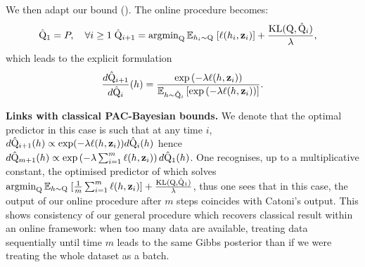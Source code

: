 We then adapt our \OPBTrain bound (). The online procedure becomes:
\begin{align}
  \label{eq: pacb_online_alg_specific_case}
  \hat{\mathrm{Q}}_1= P, \quad \forall i\geq1\; \hat{\mathrm{Q}}_{i+1}&= \operatorname{argmin}_{\mathrm{Q}} \mathbb{E}_{h_i\sim \mathrm{Q}} \; [\ell(h_i,\mathbf{z}_i)] + \frac{\operatorname{KL}(\mathrm{Q},\hat{\mathrm{Q}}_{i})}{\lambda},
\end{align}
which leads to the explicit formulation
\begin{align*}
  \frac{d\hat{\mathrm{Q}}_{i+1}}{d\hat{\mathrm{Q}}_{i}}(h) = \frac{\exp\left(-\lambda  \ell(h,\mathbf{z}_i)\right)}{\mathbb{E}_{h\sim \hat{\mathrm{Q}}_{i}}\left[\exp\left(-\lambda  \ell(h,\mathbf{z}_i)\right)\right]}.
\end{align*}

\textbf{Links with classical PAC-Bayesian bounds.} We denote that the optimal predictor in this case is such that at any time $i$, $d\hat{\mathrm{Q}}_{i+1}(h) \propto \exp(-\lambda \ell(h,\mathbf{z}_i))d\hat{\mathrm{Q}}_i(h) $ hence $d\hat{\mathrm{Q}}_{m+1}(h) \propto \exp\left(-\lambda\sum_{i=1}^m \ell(h,\mathbf{z}_i)\right)d\hat{\mathrm{Q}}_1(h) $.
One recognises, up to a multiplicative constant, the optimised predictor of \citet[][Th 1.2.6]{catoni2007pac} which solves
$\operatorname{argmin}_{\mathrm{Q}} \mathbb{E}_{h\sim \mathrm{Q}} \; [\frac{1}{m}\sum_{i=1}^m \ell(h,\mathbf{z}_i)] + \frac{\operatorname{KL}(\mathrm{Q}, \hat{\mathrm{Q}}_{1})}{\lambda}$, thus one sees that in this case, the output of our online procedure after $m$ steps coincides with Catoni's output. This shows consistency of our general procedure which recovers classical result within an online framework: when too many data are available, treating data sequentially until time $m$ leads to the same Gibbs posterior than if we were treating the whole dataset as a batch.


